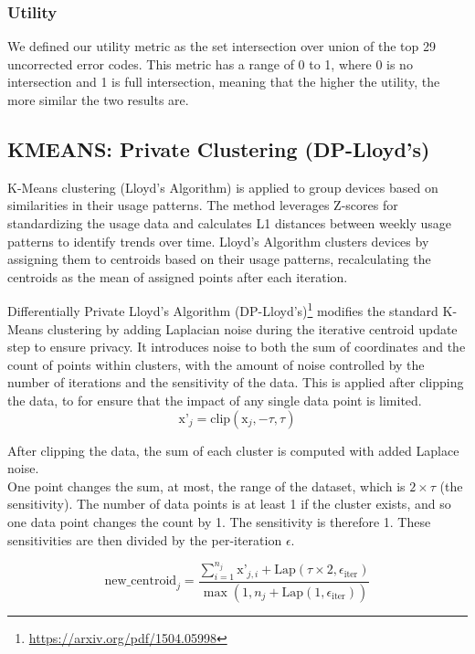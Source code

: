 \documentclass[12pt,letterpaper]{article}
\begin{document}
\subsubsection{Utility}

We defined our utility metric as the set intersection over union of the top 29 uncorrected error codes.
This metric has a range of 0 to 1, where 0 is no intersection and 1 is full intersection,
meaning that the higher the utility, the more similar the two results are.


\subsection{KMEANS: Private Clustering (DP-Lloyd's)}

K-Means clustering (Lloyd's Algorithm) is applied to group devices based on similarities in their usage patterns. The method leverages Z-scores for standardizing the usage data and calculates L1 distances between weekly usage patterns to identify trends over time. Lloyd's Algorithm clusters devices by assigning them to centroids based on their usage patterns, recalculating the centroids as the mean of assigned points after each iteration. 

Differentially Private Lloyd's Algorithm (DP-Lloyd's)\footnote{\url{https://arxiv.org/pdf/1504.05998}} modifies the standard K-Means clustering by adding Laplacian noise during the iterative centroid update step to ensure privacy. It introduces noise to both the sum of coordinates and the count of points within clusters, with the amount of noise controlled by the number of iterations and the sensitivity of the data. This is applied after clipping the data, to for ensure that the impact of any single data point is limited. 
\[
\text{x'}_j = \text{clip}\left( \text{x}_j, -\tau, \tau \right)
\]

After clipping the data, the sum of each cluster is computed with added Laplace noise. \\
One point changes the sum, at most, the range of the dataset, which is \(2 \times \tau\) (the sensitivity). The number of data points is at least 1 if the cluster exists, and so one data point changes the count by 1. The sensitivity is therefore 1. These sensitivities are then divided by the per-iteration  $\epsilon$.

\[
\text{new\_centroid}_j=
\frac{
    \sum_{i=1}^{n_j} \text{x'}_{j,i} + \text{Lap}(\tau \times 2, \epsilon_{\text{iter}})
}{
    \max\left( 1, n_j + \text{Lap}(1, \epsilon_{\text{iter}}) \right)
}
\]
\end{document}
